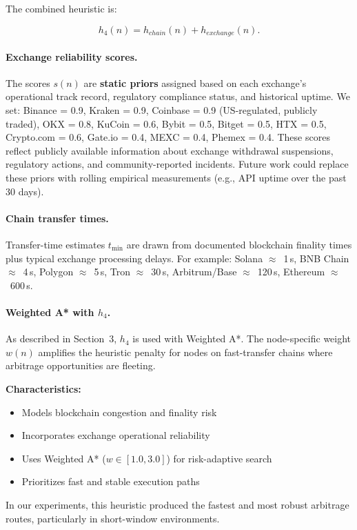 The combined heuristic is:

\[
h_4(n) = h_{chain}(n) + h_{exchange}(n).
\]

\paragraph{Exchange reliability scores.}
The scores $s(n)$ are \textbf{static priors} assigned based on each exchange's operational track record, regulatory compliance status, and historical uptime. We set: Binance = 0.9, Kraken = 0.9, Coinbase = 0.9 (US-regulated, publicly traded), OKX = 0.8, KuCoin = 0.6, Bybit = 0.5, Bitget = 0.5, HTX = 0.5, Crypto.com = 0.6, Gate.io = 0.4, MEXC = 0.4, Phemex = 0.4. These scores reflect publicly available information about exchange withdrawal suspensions, regulatory actions, and community-reported incidents. Future work could replace these priors with rolling empirical measurements (e.g., API uptime over the past 30 days).

\paragraph{Chain transfer times.}
Transfer-time estimates $t_{\min}$ are drawn from documented blockchain finality times plus typical exchange processing delays. For example: Solana $\approx$~1\,s, BNB Chain $\approx$~4\,s, Polygon $\approx$~5\,s, Tron $\approx$~30\,s, Arbitrum/Base $\approx$~120\,s, Ethereum $\approx$~600\,s.

\paragraph{Weighted A* with $h_4$.}
As described in Section~3, $h_4$ is used with Weighted A*. The node-specific weight $w(n)$ amplifies the heuristic penalty for nodes on fast-transfer chains where arbitrage opportunities are fleeting.

\textbf{Characteristics:}
\begin{itemize}
    \item Models blockchain congestion and finality risk
    \item Incorporates exchange operational reliability
    \item Uses Weighted A* ($w \in [1.0, 3.0]$) for risk-adaptive search
    \item Prioritizes fast and stable execution paths
\end{itemize}

In our experiments, this heuristic produced the fastest and most robust arbitrage routes, particularly in short-window environments.